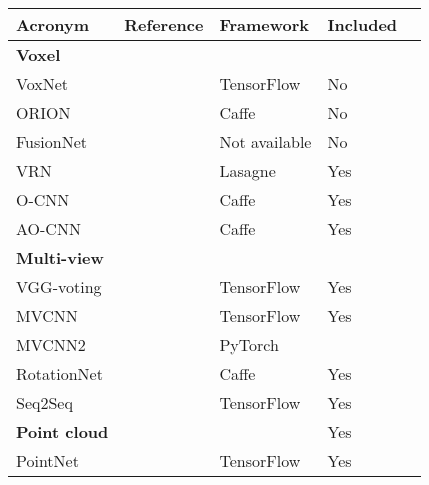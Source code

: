 \begin{table}[]
	\begin{tabular}{lllll}
		\hline
		\textbf{Acronym}       & \textbf{Reference}                       & \textbf{Framework} & \textbf{Included} &  \\ \hline
		\textbf{Voxel }        &                                          &                    &                   &  \\
		VoxNet                 & \cite{maturana_voxnet:_2015}             & TensorFlow         & No                &  \\
		ORION                  & \cite{sedaghat_orientation-boosted_2016} & Caffe              & No                &  \\
		FusionNet              & \cite{hegde_fusionnet:_2016}             & Not available      & No                &  \\
		VRN                    & \cite{brock_generative_2016}             & Lasagne            & Yes               &  \\
		O-CNN                  & \cite{wang_o-cnn:_2017}                  & Caffe              & Yes               &  \\
		AO-CNN                 & \cite{wang_adaptive_2018}                & Caffe              & Yes               &  \\
		\textbf{Multi-view }   &                                          &                    &                   &  \\
		VGG-voting             & \cite{simonyan_very_2014}                & TensorFlow         & Yes               &  \\
		MVCNN                  & \cite{su_multi-view_2015}                & TensorFlow         & Yes               &  \\
		MVCNN2                 & \cite{su_deeper_2018}                    & PyTorch            &                   &  \\
		RotationNet            & \cite{kanezaki_rotationnet:_2016}        & Caffe              & Yes               &  \\
		Seq2Seq                & \cite{zhizhong_seqviews2seqlabels:_2018} & TensorFlow         & Yes               &  \\
		\textbf{Point cloud  } &                                          &                    & Yes               &  \\
		PointNet               & \cite{qi_pointnet:_2016}                 & TensorFlow         & Yes               &  \\

\end{tabular}
\end{table}
